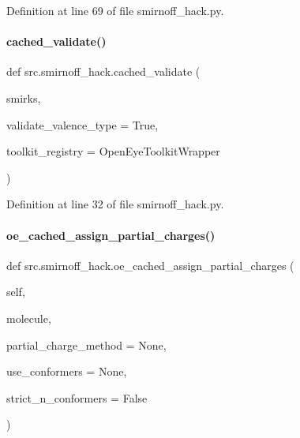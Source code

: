 Definition at line 69 of file smirnoff\+\_\+hack.\+py.

\mbox{\label{namespacesrc_1_1smirnoff__hack_a6a49d7ed65819ec63d5d3fd383ff1e16}} 
\paragraph{\texorpdfstring{cached\+\_\+validate()}{cached\_validate()}}
{\footnotesize\ttfamily def src.\+smirnoff\+\_\+hack.\+cached\+\_\+validate (\begin{DoxyParamCaption}\item[{}]{smirks,  }\item[{}]{validate\+\_\+valence\+\_\+type = {\ttfamily True},  }\item[{}]{toolkit\+\_\+registry = {\ttfamily OpenEyeToolkitWrapper} }\end{DoxyParamCaption})}



Definition at line 32 of file smirnoff\+\_\+hack.\+py.

\mbox{\label{namespacesrc_1_1smirnoff__hack_a06941e60fa309f7a237e9f62b8d31a1a}} 
\paragraph{\texorpdfstring{oe\+\_\+cached\+\_\+assign\+\_\+partial\+\_\+charges()}{oe\_cached\_assign\_partial\_charges()}}
{\footnotesize\ttfamily def src.\+smirnoff\+\_\+hack.\+oe\+\_\+cached\+\_\+assign\+\_\+partial\+\_\+charges (\begin{DoxyParamCaption}\item[{}]{self,  }\item[{}]{molecule,  }\item[{}]{partial\+\_\+charge\+\_\+method = {\ttfamily None},  }\item[{}]{use\+\_\+conformers = {\ttfamily None},  }\item[{}]{strict\+\_\+n\+\_\+conformers = {\ttfamily False} }\end{DoxyParamCaption})}



